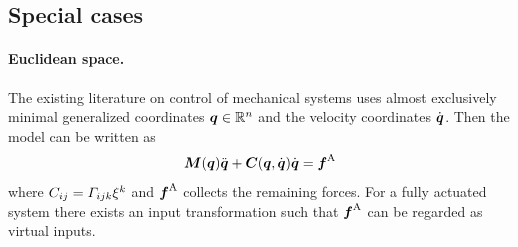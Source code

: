 
\subsection{Special cases}\label{sec:ComputedTorque}
\paragraph{Euclidean space.}
The existing literature on control of mechanical systems uses almost exclusively minimal generalized coordinates $\boldsymbol{q} \in \mathbb{R}^n$ and the velocity coordinates $\dot{\boldsymbol{q}}$.
Then the model can be written as
\begin{align}
 \boldsymbol{M}(\boldsymbol{q}) \ddot{\boldsymbol{q}} + \boldsymbol{C}(\boldsymbol{q}, \dot{\boldsymbol{q}}) \dot{\boldsymbol{q}} = \boldsymbol{f}^{\mathrm{A}} 
\end{align}
where $C_{ij} = \varGamma_{ijk}\xi^{k}$ and $\boldsymbol{f}^{\mathrm{A}}$ collects the remaining forces.
For a fully actuated system there exists an input transformation such that $\boldsymbol{f}^{\mathrm{A}}$ can be regarded as virtual inputs.

